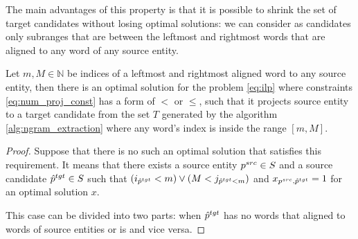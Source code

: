 The main advantages of this property is that it is possible to shrink the set of target candidates without losing
optimal solutions: we can consider as candidates only subranges that are between the leftmost and rightmost words that are aligned to any
word of any source entity.
\begin{theorem}
  Let \( m, M \in \mathbb{N} \) be indices of a leftmost and rightmost aligned word to any source entity, then there is
  an optimal solution for the problem \eqref{eq:ilp} where constraints \eqref{eq:num_proj_const} has a form
  of \( < \) or \( \leq \), such that it projects source entity to a target candidate from the set \( T \) generated by the algorithm
  \ref{alg:ngram_extraction} where any word's index is inside the range \( [m, M] \).
\end{theorem}
\begin{proof}
  Suppose that there is no such an optimal solution that satisfies this requirement. It means that there exists
  a source entity \( p^{src} \in S \) and a source candidate
  \( \hat{p}^{tgt} \in S \) such that \( (i_{\hat{p}^{tgt}} < m) \lor (M < j_{\hat{p}^{tgt} < m}) \)
  and \( x_{p^{src}, \hat{p}^{tgt}} = 1 \) for an optimal solution \( x \).

  This case can be divided into two parts: when \( \hat{p}^{tgt} \) has no words that aligned to words of source entities or
  is and vice versa.


\end{proof}
